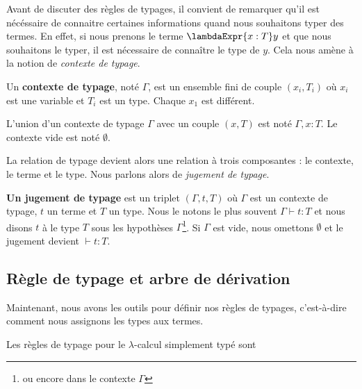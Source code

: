 Avant de discuter des règles de typages, il convient de remarquer qu'il est
nécéssaire de connaitre certaines informations quand nous souhaitons typer des
termes. En effet, si nous prenons le terme $\lambdaExpr{x : T} y$ et que nous
souhaitons le typer, il est nécessaire de connaître le type de $y$. Cela nous
amène à la notion de \textit{contexte de typage}.

\begin{definition} 
  Un \textbf{contexte de typage}, noté $\Gamma$, est un ensemble fini de couple $(x_{i},
  T_{i})$ où $x_{i}$ est une variable et $T_{i}$ est un type. Chaque $x_{1}$ est différent.
  
  L'union d'un contexte de typage $\Gamma$ avec un couple $(x, T)$ est noté
  $\Gamma, x : T$. Le contexte vide est noté $\emptyset$.
\end{definition}

La relation de typage devient alors une relation à trois composantes : le
contexte, le terme et le type. Nous parlons alors de \textit{jugement de typage}.

\begin{definition} 
  \textbf{Un jugement de typage} est un triplet $(\Gamma, t, T)$ où $\Gamma$ est un
  contexte de typage, $t$ un terme et $T$ un type. Nous le notons le plus
  souvent $\Gamma \vdash t : T$ et nous disons \og $t$ à le type $T$ sous les
  hypothèses $\Gamma$\footnote{ou encore dans le contexte $\Gamma$}. Si $\Gamma$
  est vide, nous omettons $\emptyset$ et le jugement devient $\vdash t : T$.
\end{definition}

\subsection*{Règle de typage et arbre de dérivation}

Maintenant, nous avons les outils pour définir nos règles de typages,
c'est-à-dire comment nous assignons les types aux termes.

\begin{definition} 
  Les règles de typage pour le $\lambda$-calcul simplement typé sont
\end{definition}

